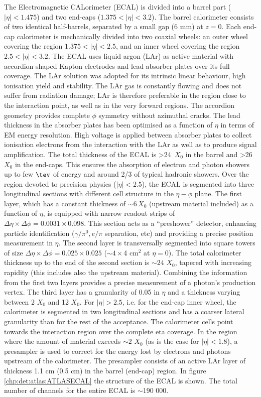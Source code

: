 The  Electromagnetic CALorimeter (ECAL) is  divided  into  a  barrel  part  ($|\eta|< 1.475$)  and  two  end-caps ($1.375 <|\eta|< 3.2$). The barrel calorimeter consists of two identical half-barrels, separated by a small gap (6 mm) at $z=0$. Each end-cap calorimeter is mechanically divided into two coaxial wheels: an outer wheel covering the region $1.375 <|\eta|< 2.5$, and an inner wheel covering the region $2.5 <|\eta|< 3.2$.
The ECAL uses liquid argon (LAr) as active material with accordion-shaped Kapton electrodes and lead absorber plates over its full coverage. The LAr solution was adopted for its intrinsic linear behaviour, high ionisation yield and stability. The LAr gas is constantly flowing and does not suffer from radiation damage; LAr is therefore preferable in the region close to the interaction point, as well as in the very forward regions. The accordion geometry provides complete $\phi$ symmetry without  azimuthal  cracks.  The  lead  thickness  in  the  absorber  plates  has  been  optimised  as  a function of $\eta$ in terms of EM energy resolution. High voltage is applied between absorber plates to collect ionisation electrons  from the interaction with the LAr as well as to produce signal amplification.
The total thickness of the ECAL is >24~$X_{0}$ in the barrel and >26~$X_{0}$ in the end-caps. This ensures the absorption of electron and photon showers up to few $\tev$ of energy and around 2/3 of typical hadronic showers. Over the region devoted to precision physics ($|\eta|< 2.5$), the ECAL is segmented into three longitudinal sections with different cell structure in the $\eta-\phi$ plane. 
The first layer, which has a constant thickness of $\sim6\,X_{0}$ (upstream material included) as a function of $\eta$, is equipped with narrow readout strips of $\Delta \eta \times \Delta \phi =  0.0031 \times 0.098$.  This  section  acts  as  a  ``preshower''  detector,  enhancing  particle  identification ($\gamma/\pi^{0}, e/\pi$ separation, etc) and providing a precise position measurement in $\eta$. The second layer is  transversally  segmented  into  square  towers  of size $\Delta \eta \times \Delta \phi =  0.025 \times 0.025$  ($\sim 4\times$4 cm$^{2}$ at $\eta=0$). 
The total calorimeter thickness up to the end of the second section is $\sim24$ $X_{0}$, tapered with increasing rapidity (this includes also the upstream material). Combining the information from the first two layers provides a precise measurement of a photon's production vertex. The third layer has a granularity of 0.05 in $\eta$ and a thickness varying between 2 $X_{0}$  and 12 $X_{0}$. For $|\eta|> 2.5$, i.e. for the end-cap inner wheel, the calorimeter is segmented in two longitudinal sections and has a coarser lateral granularity than for the rest of the acceptance. The calorimeter cells point towards the interaction region over the complete eta coverage.  In the region where the amount of material exceeds $\sim2$ $X_{0}$ (as is the case for $|\eta|< 1.8$), a presampler is used to correct for the energy lost by electrons and photons upstream of the calorimeter. The presampler consists of an active LAr layer of thickness 1.1 cm (0.5 cm) in the barrel (end-cap) region. In figure \ref{chp:det:atlas:ATLASECAL} the structure of the ECAL is shown. The total number of channels for the entire ECAL is $\sim$190 000. 
